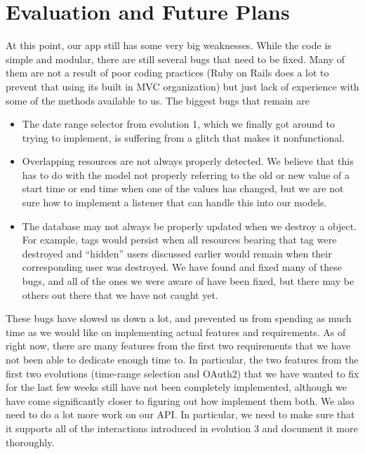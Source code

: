 \documentclass{article}
\begin{document}
\section{Evaluation and Future Plans}
At this point, our app still has some very big weaknesses.  While the code is simple and modular, there are still several bugs that need to be fixed.  Many of them are not a result of poor coding practices (Ruby on Rails does a lot to prevent that using its built in MVC organization) but just lack of experience with some of the methods available to us.  The biggest bugs that remain are
\begin{itemize}
\item{The date range selector from evolution 1, which we finally got around to trying to implement, is suffering from a glitch that makes it nonfunctional.}
\item{Overlapping resources are not always properly detected.  We believe that this has to do with the model not properly referring to the old or new value of a start time or end time when one of the values has changed, but we are not sure how to implement a listener that can handle this into our models.}
\item{The database may not always be properly updated when we destroy a object.  For example, tags would persist when all resources bearing that tag were destroyed and ``hidden'' users discussed earlier would remain when their corresponding user was destroyed.  We have found and fixed many of these bugs, and all of the ones we were aware of have been fixed, but there may be others out there that we have not caught yet.}
\end{itemize}
These bugs have slowed us down a lot, and prevented us from spending as much time as we would like on implementing actual features and requirements.  As of right now, there are many features from the first two requirements that we have not been able to dedicate enough time to.  In particular, the two features from the first two evolutions (time-range selection and OAuth2) that we have wanted to fix for the last few weeks still have not been completely implemented, although we have come significantly closer to figuring out how implement them both.  We also need to do a lot more work on our API.  In particular, we need to make sure that it supports all of the interactions introduced in evolution 3 and document it more thoroughly.
\end{document}
